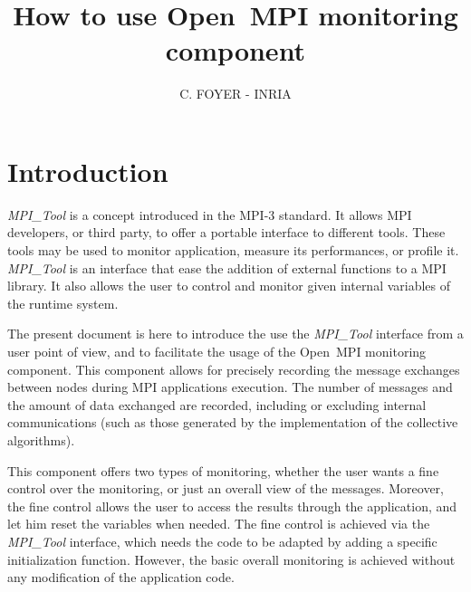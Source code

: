 \documentclass[notitlepage]{article}
\title{How to use Open~MPI monitoring component}
\author{C. FOYER - INRIA}
\newcommand{\mpit}[1]{\textit{MPI\_Tool#1}}
\newcommand{\ompi}[0]{Open~MPI}
\begin{document}
\maketitle

\section{Introduction}

\mpit{} is a concept introduced in the MPI-3 standard. It allows MPI
developers, or third party, to offer a portable interface to different
tools. These tools may be used to monitor application, measure its
performances, or profile it. \mpit{} is an interface that ease the
addition of external functions to a MPI library. It also allows the
user to control and monitor given internal variables of the runtime
system.

The present document is here to introduce the use the \mpit{}
interface from a user point of view, and to facilitate the usage of
the \ompi{} monitoring component. This component allows for
precisely recording the message exchanges between nodes during MPI
applications execution. The number of messages and the amount of data
exchanged are recorded, including or excluding internal communications
(such as those generated by the implementation of the collective
algorithms).

This component offers two types of monitoring, whether the user wants
a fine control over the monitoring, or just an overall view of the
messages. Moreover, the fine control allows the user to access the
results through the application, and let him reset the variables when
needed. The fine control is achieved via the \mpit{} interface, which
needs the code to be adapted by adding a specific initialization
function. However, the basic overall monitoring is achieved without
any modification of the application code.
\end{document}

